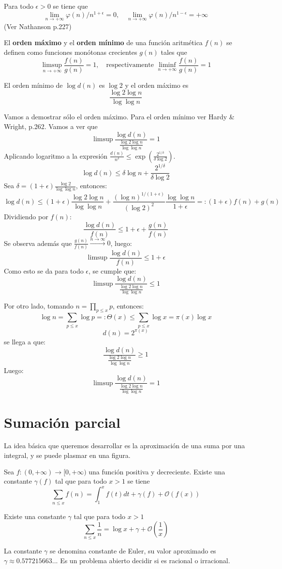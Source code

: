 \documentclass[TAN.tex]{subfiles}
\begin{document}
\begin{prop}
Para todo $ϵ > 0$ se tiene que
\[ \lim_{n \to +∞} φ(n)/n^{1+ϵ} =0, \quad \lim_{n \to +∞} φ(n)/n^{1-ϵ} = +∞ \]
(Ver Nathanson p.227)
\end{prop}
El \textbf{orden máximo} y el \textbf{orden mínimo} de una función aritmética $f(n)$ se definen como funciones monótonas crecientes $g(n)$ tales que
\[ \limsup_{n\to+∞} \frac{f(n)}{g(n)} = 1, \quad \text{respectivamente }\liminf_{n\to+∞}\frac{f(n)}{g(n)} = 1 \]
\begin{prop}
El orden mínimo de $\log d(n)$ es $\log 2$ y el orden máximo es
\[ \frac{\log 2 \log n}{\log \log n} \]
\end{prop}
\begin{dem}
Vamos a demostrar sólo el orden máximo. Para el orden mínimo ver Hardy \& Wright, p.262. Vamos a ver que
\[ \limsup \frac{\log d(n)}{\frac{\log 2 \log n}{\log \log n}} = 1\]
Aplicando logaritmo a la expresión $\frac{d(n)}{n^δ} ≤ \exp\left(\frac{2^{1/δ}}{δ\log 2}\right)$.
\[
	\log d(n) ≤ δ\log n + \frac{2^{1/δ}}{δ\log 2}
\]
Sea $δ = (1+ϵ)\frac{\log 2}{\log \log n}$, entonces:
\[
	\log d(n) ≤ (1+ϵ) \frac{\log 2 \log n}{\log \log n} + \frac{(\log n)^{1/(1+ϵ)}}{(\log 2)^2} \frac{\log \log n}{1+ϵ} =: (1+ϵ)f(n) + g(n)
\]
Dividiendo por $f(n)$:
\[ 
	\frac{\log d(n)}{f(n)} ≤ 1 + ϵ + \frac{g(n)}{f(n)}
\]
Se observa además que $\frac{g(n)}{f(n)} \xrightarrow{n \to ∞} 0$, luego:
\[ 
	\limsup \frac{\log d(n)}{f(n)} ≤ 1+ϵ
\]
Como esto se da para todo $ϵ$, se cumple que:
\[ 
	\limsup \frac{\log d(n)}{\frac{\log 2 \log n}{\log \log n}} ≤ 1
\]

Por otro lado, tomando $n = \prod_{p≤x} p$, entonces:
\[ \log n = \sum_{p≤x} \log p =: Θ(x) ≤ \sum_{p≤x} \log x = π(x) \log x \]
\[ d(n) = 2^{π(x)} \]
se llega a que:
\[ \frac{\log d(n)}{\frac{\log 2 \log n}{\log \log n}} ≥ 1 \]
Luego:
\[
	\limsup \frac{\log d(n)}{\frac{\log 2 \log n}{\log \log n}} = 1 
\]
\end{dem}

\section{Sumación parcial}
La idea básica que queremos desarrollar es la aproximación de una suma por una integral, y se puede plasmar en una figura.

\begin{teorema}
Sea $f : (0,+\infty) \to [0,+\infty)$ una función positiva y decreciente. Existe una constante $γ(f)$ tal que para todo $x>1$ se tiene
\[ \sum_{n≤x} f(n) = \int_1^x f(t)dt + γ(f) + \mathcal{O}(f(x)) \]
\end{teorema}
\begin{teorema}
Existe una constante $γ$ tal que para todo $x>1$
\[ \sum_{n≤x} \frac{1}{n} = \log x + γ + \mathcal{O}\left(\frac{1}{x}\right) \]
\end{teorema}
La constante $γ$ se denomina constante de Euler, su valor aproximado es $γ \approx 0.577215663...$ Es un problema abierto decidir si es racional o irracional.
\end{document}
